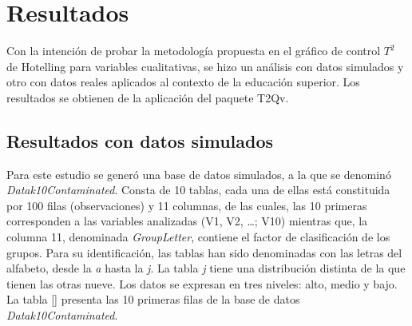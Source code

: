 \documentclass[water,article,submit,moreauthors,pdftex]{mdpi}
\begin{document}
\hypertarget{resultados}{%
\section{Resultados}\label{resultados}}

Con la intención de probar la metodología propuesta en el gráfico de
control \(T^2\) de Hotelling para variables cualitativas, se hizo un
análisis con datos simulados y otro con datos reales aplicados al
contexto de la educación superior. Los resultados se obtienen de la
aplicación del paquete T2Qv.

\hypertarget{resultados-con-datos-simulados}{%
\subsection{Resultados con datos
simulados}\label{resultados-con-datos-simulados}}

Para este estudio se generó una base de datos simulados, a la que se
denominó \emph{Datak10Contaminated}. Consta de 10 tablas, cada una de
ellas está constituida por 100 filas (observaciones) y 11 columnas, de
las cuales, las 10 primeras corresponden a las variables analizadas (V1,
V2, \ldots; V10) mientras que, la columna 11, denominada
\emph{GroupLetter}, contiene el factor de clasificación de los grupos.
Para su identificación, las tablas han sido denominadas con las letras
del alfabeto, desde la \emph{a} hasta la \emph{j}. La tabla \emph{j}
tiene una distribución distinta de la que tienen las otras nueve. Los
datos se expresan en tres niveles: alto, medio y bajo. La tabla \ref{}
presenta las 10 primeras filas de la base de datos
\emph{Datak10Contaminated}.
\end{document}
